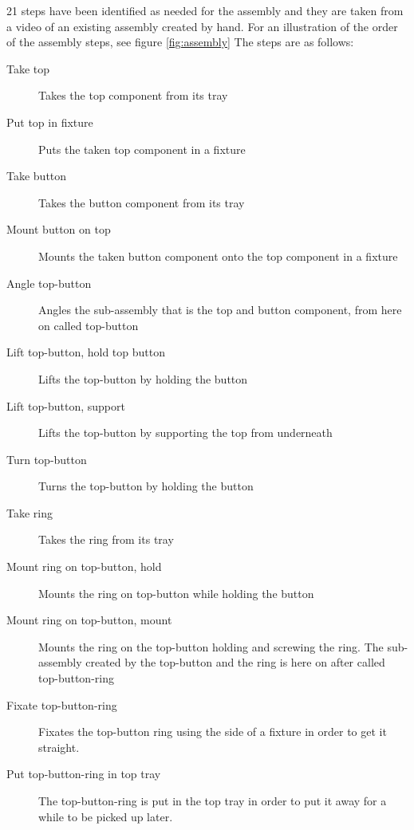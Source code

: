 21 steps have been identified as needed for the assembly and they are taken from a video of an existing assembly created by hand. For an illustration of the order of the assembly steps, see figure \ref{fig:assembly} The steps are as follows:

\begin{description}
\item[Take top] Takes the top component from its tray

\item[Put top in fixture] Puts the taken top component in a fixture

\item[Take button] Takes the button component from its tray

\item[Mount button on top] Mounts the taken button component onto the top component in a fixture

\item[Angle top-button] Angles the sub-assembly that is the top and button component, from here on called top-button

\item[Lift top-button, hold top button] Lifts the top-button by holding the button

\item[Lift top-button, support] Lifts the top-button by supporting the top from underneath

\item[Turn top-button] Turns the top-button by holding the button

\item[Take ring] Takes the ring from its tray

\item[Mount ring on top-button, hold] Mounts the ring on top-button while holding the button

\item[Mount ring on top-button, mount] Mounts the ring on the top-button holding and screwing the ring. The sub-assembly created by the top-button and the ring is here on after called top-button-ring

\item[Fixate top-button-ring] Fixates the top-button ring using the side of a fixture in order to get it straight.

\item[Put top-button-ring in top tray] The top-button-ring is put in the top tray in order to put it away for a while to be picked up later.


\end{description}
